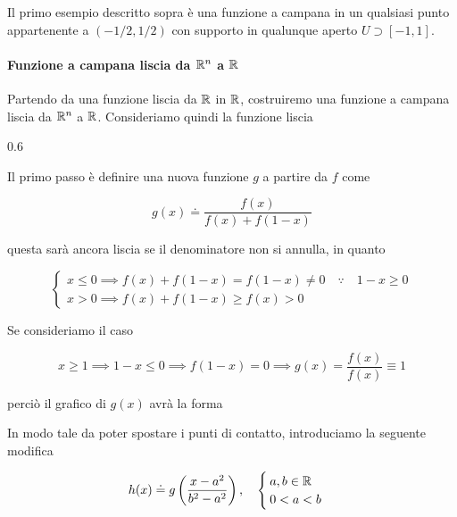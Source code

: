 Il primo esempio descritto sopra è una funzione a campana in un qualsiasi punto appartenente a $ (-1/2,1/2) $ con supporto in qualunque aperto $ U \supset [-1,1] $.

\paragraph{Funzione a campana liscia da $ \mathbb{R}^{n} $ a $ \mathbb{R} $}

Partendo da una funzione liscia da $ \mathbb{R} $ in $ \mathbb{R} $, costruiremo una funzione a campana liscia da $ \mathbb{R}^{n} $ a $ \mathbb{R} $. Consideriamo quindi la funzione liscia

	{0.6}{%
			}

Il primo passo è definire una nuova funzione $ g $ a partire da $ f $ come

\begin{equation}
	g(x) \doteq \dfrac{f(x)}{f(x) + f(1-x)}
\end{equation}

questa sarà ancora liscia se il denominatore non si annulla, in quanto

\begin{equation}
	\begin{cases}
		x \leqslant 0 \implies f(x) + f(1-x) = f(1-x) \neq 0 \quad \because \quad 1-x \geqslant 0 \\
		x > 0 \implies f(x) + f(1-x) \geqslant f(x) > 0
	\end{cases}
\end{equation}

Se consideriamo il caso

\begin{equation}
	x \geqslant 1 %
	\implies %
	1-x \leqslant 0 %
	\implies %
	f(1-x) = 0 %
	\implies %
	g(x) = \dfrac{f(x)}{f(x)} \equiv 1
\end{equation}

perciò il grafico di $ g(x) $ avrà la forma


In modo tale da poter spostare i punti di contatto, introduciamo la seguente modifica

\begin{equation}
	h(x) \doteq g \left( \dfrac{x - a^{2}}{b^{2} - a^{2}} \right) %
	\qcomma %
	\begin{cases}
		a,b \in \R \\
		0 < a < b
	\end{cases}
\end{equation}

